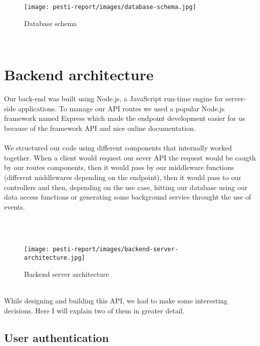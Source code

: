 \\ \\
\begin{figure}[H]
	\centering
	\texttt{[image: pesti-report/images/database-schema.jpg]}
	\caption{Database schema}
	\label{fig:database-schema}
\end{figure}
\\


\section{Backend architecture}

Our back-end was built using Node.js, a JavaScript run-time engine for server-side applications. To manage our API routes we used a popular Node.js framework named Express which made the endpoint development easier for us because of the framework API and nice online documentation.
\\ \\
We structured our code using different components that internally worked together. When a client would request our sever API the request would be caugth by our routes components, then it would pass by our middleware functions (different middlewares depending on the endpoint), then it would pass to our controllers and then, depending on the use case, hitting our database using our data access functions or generating some background service throught the use of events.


\\ \\
\begin{figure}[H]
	\centering
	\texttt{[image: pesti-report/images/backend-server-architecture.jpg]}
	\caption{Backend server architecture}
	\label{fig:backend-server-architecture}
\end{figure}
\\

While designing and building this API, we had to make some interesting decisions. Here I will explain two of them in greater detail.

\subsection{User authentication}

